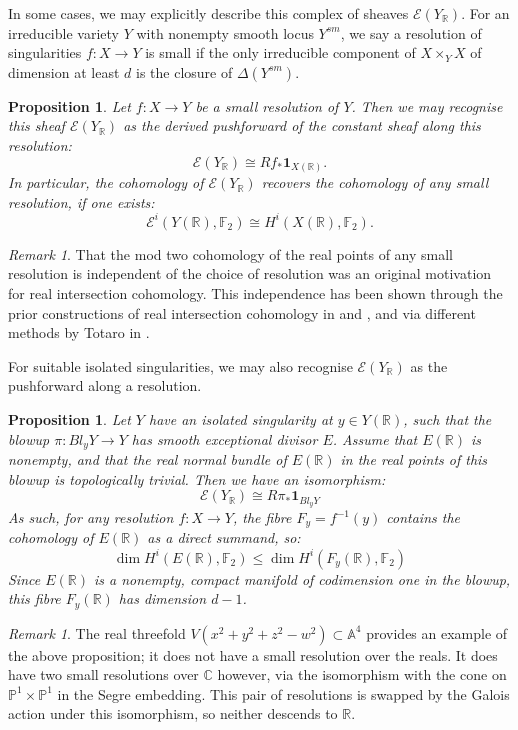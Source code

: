 \documentclass{amsart}
\newtheorem{prop}[thm]{Proposition}
\theoremstyle{definition}
\theoremstyle{remark}
\newtheorem{remark}[thm]{Remark}
\begin{document}
In some cases, we may explicitly describe this complex of sheaves $\mathscr{E}(Y_\mathbb{R})$. For an irreducible variety $Y$ with nonempty smooth locus $Y^{sm}$, we say a resolution of singularities $f:X\to Y$ is small if the only irreducible component of $X\times_Y X$ of dimension at least $d$ is the closure of $\Delta(Y^{sm})$.

\begin{prop}
Let $f:X\to Y$ be a small resolution of $Y$. Then we may recognise this sheaf $\mathscr{E}(Y_\mathbb{R})$ as the derived pushforward of the constant sheaf along this resolution: \[\mathscr{E}(Y_\mathbb{R})\cong Rf_*\mathbf{1}_{X(\mathbb{R})}.\]
In particular, the cohomology of $\mathscr{E}(Y_\mathbb{R})$ recovers the cohomology of \emph{any} small resolution, if one exists:
\[\mathscr{E}^i(Y(\mathbb{R}),\mathbb{F}_2)\cong H^i(X(\mathbb{R}),\mathbb{F}_2).\]
\end{prop}


\begin{remark}
   That the mod two cohomology of the real points of any small resolution is independent of the choice of resolution was an original motivation for real intersection cohomology. This independence has been shown through the prior constructions of real intersection cohomology in \cite{Realintersectionhomology} and \cite{VanHamel}, and via different methods by Totaro in \cite{Totaro2000}.
\end{remark}
For suitable isolated singularities, we may also recognise $\mathscr{E}(Y_\mathbb{R})$ as the pushforward along a resolution.

\begin{prop}
    Let $Y$ have an isolated singularity at $y\in Y(\mathbb{R})$, such that the blowup $\pi:Bl_yY\to Y$ has smooth exceptional divisor $E$. Assume that $E(\mathbb{R})$ is nonempty, and that the real normal bundle of $E(\mathbb{R})$ in the real points of this blowup is topologically trivial. Then we have an isomorphism: \[\mathscr{E}(Y_\mathbb{R})\cong R\pi_*\mathbf{1}_{Bl_y Y}\]
    As such, for any resolution $f:X\to Y$, the fibre $F_y=f^{-1}(y)$ contains the cohomology of $E(\mathbb{R})$ as a direct summand, so:
    \[\dim H^i(E(\mathbb{R}),\mathbb{F}_2) \leq \dim H^i(F_y(\mathbb{R}),\mathbb{F}_2)\]
    Since $E(\mathbb{R})$ is a nonempty, compact manifold of codimension one in the blowup, this fibre $F_y(\mathbb{R})$ has dimension $d-1$.
\end{prop}

\begin{remark}
The real threefold $V(x^2+y^2+z^2-w^2)\subset \mathbb{A}^4$ provides an example of the above proposition; it does not have a small resolution over the reals. It does have two small resolutions over $\mathbb{C}$ however, via the isomorphism with the cone on $\mathbb{P}^1\times \mathbb{P}^1$ in the Segre embedding. This pair of resolutions is swapped by the Galois action under this isomorphism, so neither descends to $\mathbb{R}$.
\end{remark}
\end{document}
